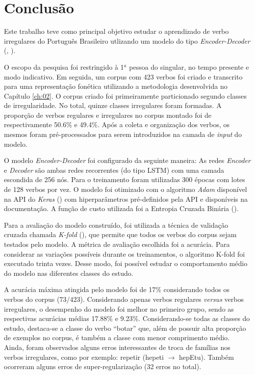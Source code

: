\chapter{Conclusão}
\label{ch:08}

Este trabalho teve como principal objetivo estudar o aprendizado de verbo irregulares do Português Brasileiro utlizando um modelo do tipo \textit{Encoder-Decoder} (\cite{enc-dec:2014}, \cite{seq2seq:2014}). 

O escopo da pesquisa foi restringido à 1$^{a}$ pessoa do singular, no tempo presente e modo indicativo. Em seguida, um corpus com 423 verbos foi criado e transcrito para uma representação fonética utilizando a metodologia desenvolvida no Capítulo \ref{ch:02}. O corpus criado foi primeiramente particionado segundo classes de irregularidade. No total, quinze classes irregulares foram formadas. A proporção de verbos regulares e irregulares no corpus montado foi de respectivamente 50.6\% e 49.4\%. Após a coleta e organização dos verbos, os mesmos foram pré-processados para serem introduzidos na camada de \textit{input} do modelo. 

O modelo \textit{Encoder-Decoder} foi configurado da seguinte maneira: As redes \textit{Encoder} e \textit{Decoder} são ambas redes recorrentes (do tipo LSTM) com uma camada escondida de 256 nós. Para o treinamento foram utilizadas 300 épocas com lotes de 128 verbos por vez. O modelo foi otimizado com o algoritmo \textit{Adam} disponível na API do \textit{Keras} (\cite{chollet2015keras}) com hiperparâmetros pré-definidos pela API e disponíveis na documentação. A função de custo utilizada foi a Entropia Cruzada Binária (\cite{francois2017deep}).

Para a avaliação do modelo construído, foi utilizada a técnica de validação cruzada chamada \textit{K-fold} (\cite{kfold:2018}), que permite que todos os verbos do corpus sejam testados pelo modelo. A métrica de avaliação escolhida foi a acurácia. Para considerar as variações possíveis durante os treinamentos, o algoritmo K-fold foi executado trinta vezes. Desse modo, foi possível estudar o comportamento médio do modelo nas diferentes classes do estudo.

A acurácia máxima atingida pelo modelo foi de 17\% considerando todos os verbos do corpus ($73/423$). Considerando apenas verbos regulares \textit{versus} verbos irregulares, o desempenho do modelo foi melhor no primeiro grupo, sendo as respectivas acurácias médias 17.88\% e 9.23\%. Considerando-se todas as classes do estudo, destaca-se a classe do verbo “botar” que, além de possuir alta proporção de exemplos no corpus, é também a classe com menor comprimento médio. Ainda, foram observados alguns erros interessantes de troca de famílias nos verbos irregulares, como por exemplo: repetir (hepeti $\rightarrow$ hepEtu). Também ocorreram alguns erros de super-regularização (32 erros no total). 

